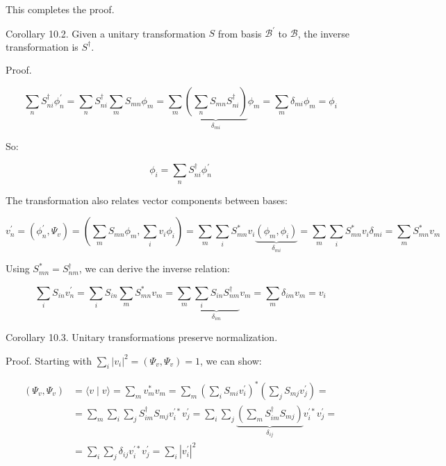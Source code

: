 \documentclass[italian]{HKNdocument}
\begin{document}
This completes the proof.

Corollary 10.2. Given a unitary transformation $S$ from basis $\mathcal{B}^{\prime}$ to $\mathcal{B}$, the inverse transformation is $S^{\dagger}$.

Proof.

\begin{equation}
\sum_{n} S_{n i}^{\dagger} \phi_{n}^{\prime}=\sum_{n} S_{n i}^{\dagger} \sum_{m} S_{m n} \phi_{m}=\sum_{m} \underbrace{\left(\sum_{n} S_{m n} S_{n i}^{\dagger}\right)}_{\delta_{m i}} \phi_{m}=\sum_{m} \delta_{m i} \phi_{m}=\phi_{i}
\end{equation}


So:

\begin{equation}
\phi_{i}=\sum_{n} S_{n i}^{\dagger} \phi_{n}^{\prime}
\end{equation}

The transformation also relates vector components between bases:

\begin{equation}
v_{n}^{\prime}=\left(\phi_{n}^{\prime}, \Psi_{v}\right)=\left(\sum_{m} S_{m n} \phi_{m}, \sum_{i} v_{i} \phi_{i}\right)=\sum_{m} \sum_{i} S_{m n}^{*} v_{i} \underbrace{\left(\phi_{m}, \phi_{i}\right)}_{\delta_{m i}}=\sum_{m} \sum_{i} S_{m n}^{*} v_{i} \delta_{m i}=\sum_{m} S_{m n}^{*} v_{m}
\end{equation}

Using $S_{m n}^{*}=S_{n m}^{\dagger}$, we can derive the inverse relation:

\begin{equation}
\sum_{i} S_{i n} v_{n}^{\prime}=\sum_{i} S_{i n} \sum_{m} S_{m n}^{*} v_{m}=\sum_{m} \underbrace{\sum_{i} S_{i n} S_{n m}^{\dagger}}_{\delta_{i m}} v_{m}=\sum_{m} \delta_{i m} v_{m}=v_{i}
\end{equation}

Corollary 10.3. Unitary transformations preserve normalization.

Proof. Starting with $\sum_{i}\left|v_{i}\right|^{2}=\left(\Psi_{v}, \Psi_{v}\right)=1$, we can show:

\begin{align}
\left(\Psi_{v}, \Psi_{v}\right) & =\langle v \mid v\rangle=\sum_{m} v_{m}^{*} v_{m}=\sum_{m}\left(\sum_{i} S_{m i} v_{i}^{\prime}\right)^{*}\left(\sum_{j} S_{m j} v_{j}^{\prime}\right)= \\
& =\sum_{m} \sum_{i} \sum_{j} S_{i m}^{\dagger} S_{m j} v_{i}^{\prime*} v_{j}^{\prime}=\sum_{i} \sum_{j} \underbrace{\left(\sum_{m} S_{i m}^{\dagger} S_{m j}\right)}_{\delta_{i j}} v_{i}^{\prime*} v_{j}^{\prime}=  \\
& =\sum_{i} \sum_{j} \delta_{i j} v_{i}^{\prime*} v_{j}^{\prime}=\sum_{i}\left|v_{i}^{\prime}\right|^{2}
\end{align}
\end{document}
